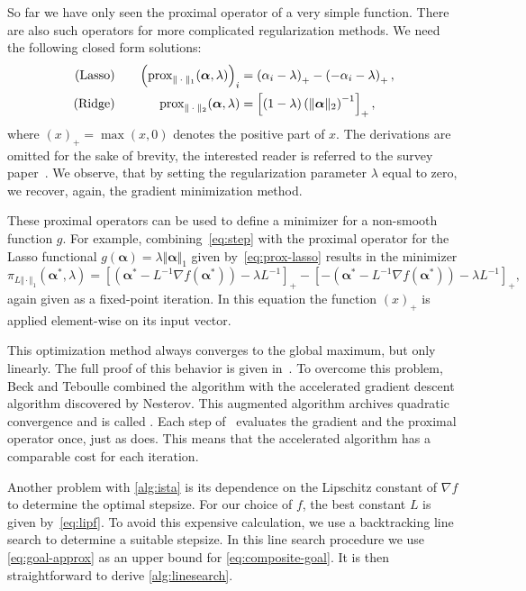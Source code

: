 So far we have only seen the proximal operator of a very simple function.
There are also such operators for more complicated regularization methods.
We need the following closed form solutions:
\begin{align}
\label{eq:prox-lasso}
\text{(Lasso)} \quad &&
\left( \prox[\(\Vert \cdot \Vert_1\)]{\bm{\alpha}}{\lambda} \right)_i &= \left(\alpha_i - \lambda \right)_+ - \left( -\alpha_i - \lambda \right)_+, \\
\text{(Ridge)} \quad &&
 \prox[\(\Vert \cdot \Vert_2\)]{\bm{\alpha}}{\lambda} &= \left[ \left(1 - \lambda \right) \left(  \Vert \bm{\alpha } \Vert_2\right)^{-1} \right]_+,
\end{align}
where \( \left( x \right)_+ = \max(x, 0) \) denotes the positive part of \(x\).
The derivations are omitted for the sake of brevity, the interested reader is referred to the survey paper~\cite{proxsurvey}.
We observe, that by setting the regularization parameter \(\lambda\) equal to zero, we recover, again, the gradient minimization method.

These proximal operators can be used to define a minimizer for a non-smooth
function \(g\).
For example, combining~\autoref{eq:step} with the proximal operator for the
Lasso functional \(g(\bm{\alpha}) = \lambda \Vert \bm{\alpha} \Vert_1\) given by~\autoref{eq:prox-lasso} results in
the minimizer
\begin{equation*}
  \pi_{L \Vert \cdot \Vert_1}(\bm{\alpha^*} ,\lambda)
  = {\left[ \left(\bm{\alpha^*} - L^{-1} \nabla f (\bm{\alpha^*}) \right) - \lambda L^{-1} \right]}_+ -
    {\left[ -\left(\bm{\alpha^*} - L^{-1} \nabla f (\bm{\alpha^*}) \right) - \lambda L^{-1} \right]}_+,
\end{equation*}
again given as a fixed-point iteration.
In this equation the function \( \left( x \right)_+ \) is applied element-wise on its input vector.

This optimization method always converges to the global maximum, but only
linearly. The full proof of this behavior is given in~\cite{fista}.
To overcome this problem, Beck and Teboulle combined the \ista algorithm with the accelerated gradient descent algorithm discovered by Nesterov. 
This augmented algorithm archives quadratic convergence and is called \fista.
Each step of \fista\ evaluates the gradient and the proximal operator once, just as \ista does.
This means that the accelerated algorithm has a comparable cost for each iteration.

Another problem with \autoref{alg:ista} is its dependence on the Lipschitz constant of
\(\nabla f\) to determine the optimal stepsize.
For our choice of \(f\), the best constant \(L\) is given by~\autoref{eq:lipf}.
To avoid this expensive calculation, we use a backtracking line search to
determine a suitable stepsize.
In this line search procedure we use \autoref{eq:goal-approx} as an upper bound for \autoref{eq:composite-goal}.
It is then straightforward to derive \autoref{alg:linesearch}.

